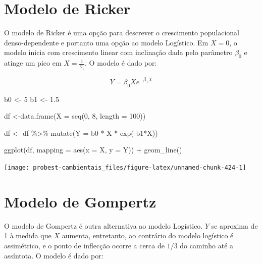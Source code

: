 \documentclass[
]{book}
\newenvironment{Shaded}{\begin{snugshade}}{\end{snugshade}}
\newcommand{\AttributeTok}[1]{\textcolor[rgb]{0.77,0.63,0.00}{#1}}
\newcommand{\DecValTok}[1]{\textcolor[rgb]{0.00,0.00,0.81}{#1}}
\newcommand{\FloatTok}[1]{\textcolor[rgb]{0.00,0.00,0.81}{#1}}
\newcommand{\FunctionTok}[1]{\textcolor[rgb]{0.00,0.00,0.00}{#1}}
\newcommand{\NormalTok}[1]{#1}
\newcommand{\OtherTok}[1]{\textcolor[rgb]{0.56,0.35,0.01}{#1}}
\newcommand{\SpecialCharTok}[1]{\textcolor[rgb]{0.00,0.00,0.00}{#1}}
\begin{document}
\hypertarget{modelo-de-ricker}{%
\section{Modelo de Ricker}\label{modelo-de-ricker}}

O modelo de Ricker é uma opção para descrever o crescimento populacional denso-dependente e portanto uma opção ao modelo Logístico. Em \(X = 0\), o modelo inicia com crescimento linear com inclinação dada pelo parâmetro \(\beta_0\) e atinge um pico em \(X = \frac{1}{\beta_1}\). O modelo é dado por:

\[Y = \beta_0 X e^{-\beta_1 X}\]

\begin{Shaded}
\begin{Highlighting}[]
\NormalTok{b0 }\OtherTok{\textless{}{-}} \DecValTok{5}
\NormalTok{b1 }\OtherTok{\textless{}{-}} \FloatTok{1.5}

\NormalTok{df }\OtherTok{\textless{}{-}}\FunctionTok{data.frame}\NormalTok{(}\AttributeTok{X =} \FunctionTok{seq}\NormalTok{(}\DecValTok{0}\NormalTok{, }\DecValTok{8}\NormalTok{, }\AttributeTok{length =} \DecValTok{100}\NormalTok{))}

\NormalTok{df }\OtherTok{\textless{}{-}}\NormalTok{ df }\SpecialCharTok{\%\textgreater{}\%} \FunctionTok{mutate}\NormalTok{(}\AttributeTok{Y =}\NormalTok{ b0 }\SpecialCharTok{*}\NormalTok{ X }\SpecialCharTok{*} \FunctionTok{exp}\NormalTok{(}\SpecialCharTok{{-}}\NormalTok{b1}\SpecialCharTok{*}\NormalTok{X))}

\FunctionTok{ggplot}\NormalTok{(df, }\AttributeTok{mapping =} \FunctionTok{aes}\NormalTok{(}\AttributeTok{x =}\NormalTok{ X, }\AttributeTok{y =}\NormalTok{ Y)) }\SpecialCharTok{+}
  \FunctionTok{geom\_line}\NormalTok{()}
\end{Highlighting}
\end{Shaded}

\begin{center}\texttt{[image: probest-cambientais\_files/figure-latex/unnamed-chunk-424-1]} \end{center}

\hypertarget{modelo-de-gompertz}{%
\section{Modelo de Gompertz}\label{modelo-de-gompertz}}

O modelo de Gompertz é outra alternativa ao modelo Logístico. \(Y\) se aproxima de 1 à medida que \(X\) aumenta, entretanto, ao contrário do modelo logístico é assimétrico, e o ponto de inflecção ocorre a cerca de \(1/3\) do caminho até a assíntota. O modelo é dado por:
\end{document}
